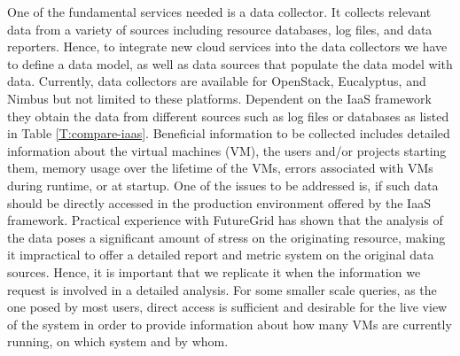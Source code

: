 \documentclass{tex/sig-alternate-2013}
\begin{document}
One of the fundamental services needed is a data collector. It collects relevant data from a variety of sources including resource databases, log files, and data reporters. Hence, to integrate new cloud services into the data collectors we have to define a data model, as well as data sources that populate the data model with data. Currently, data collectors are available for OpenStack, Eucalyptus, and Nimbus but not limited to these platforms. Dependent on the IaaS framework they obtain the data from different sources such as log files or databases as listed in Table \ref{T:compare-iaas}. Beneficial information to be collected includes detailed information about the virtual machines (VM), the users and/or projects starting them, memory usage over the lifetime of the VMs, errors associated with VMs during runtime, or at startup. One of the issues to be addressed is, if such data should be directly accessed in the production environment offered by the IaaS framework. Practical experience with FutureGrid has shown that the analysis of the data poses a significant amount of stress on the originating resource, making it impractical to offer a detailed report and metric system on the original data sources. Hence, it is important that we replicate it when the information we request is involved in a detailed analysis. For some smaller scale queries, as the one posed by most users, direct access is sufficient and desirable for the live view of the system in order to provide information about how many VMs are currently running, on which system and by whom.

\newcommand{\YES}{\ding{51}}
\newcommand{\NO}{\ding{55}}
\end{document}
